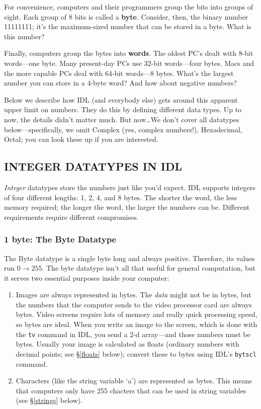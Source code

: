 \documentclass[psfig,preprint]{aastex}
\begin{document}
	For convenience, computers and their programmers group the bits
into groups of eight. Each group of 8 bits is called a {\bf byte}.
Consider, then, the binary number 11111111; it's the maximum-sized
number that can be stored in a byte. What is this number? 

	Finally, computers group the bytes into {\bf words}.  The oldest
PC's dealt with 8-bit words---one byte.  Many present-day PCs use 32-bit
words---four bytes.  Macs and the more capable PCs deal with 64-bit
words---8 bytes. What's the largest number you can store in a 4-byte
word? And how about negative numbers?

	Below we describe how IDL (and everybody else) gets around this
apparent upper limit on numbers.  They do this by defining different
data types.  Up to now, the details didn't matter much.  But now\dots We
don't cover all datatypes below---specifically, we omit Complex (yes,
complex numbers!), Hexadecimal, Octal;
you can look these up if you are interested. 

\subsection {INTEGER DATATYPES IN IDL}

	{\it Integer} datatypes store the numbers just like you'd
expect. IDL supports integers of four different lengths: 1, 2, 4, and 8
bytes. The shorter the word, the less memory required; the longer the
word, the larger the numbers can be. Different requirements require
different compromises.

\subsubsection {1 byte: The Byte Datatype}

	The Byte datatype is a single byte long and always positive. 
Therefore, its values run $0 \rightarrow 255$.  The byte datatype isn't all
that useful for general computation, but it serves two essential purposes
inside your computer: \begin{enumerate}

  \item Images are always
represented in bytes.  The {\it data} might not be in bytes, but the
numbers that the computer sends to the video processor card are always
bytes.  Video screens require lots of memory and really quick processing
speed, so bytes are ideal.  When you write an image to the screen, which is
done with the {\tt tv} command in IDL, you send a 2-d array---and those
numbers must be bytes. Usually your image is calculated as floats (ordinary
numbers with decimal points; see \S \ref{floats} below); convert these to
bytes using IDL's {\tt bytscl} command.

\item Characters (like the string variable `a') are represented as
  bytes. This means that computers only have 255 chacters that can be used
  in string variables (see \S \ref{strings} below).
\end{enumerate}
\end{document}
